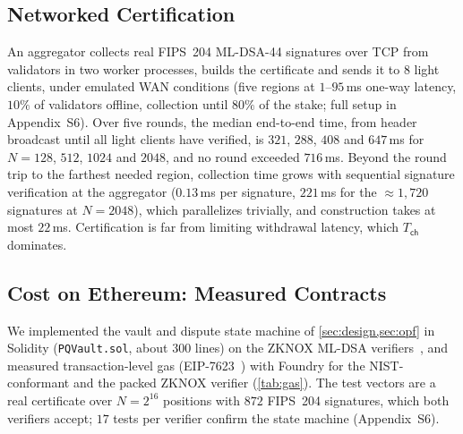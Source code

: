 \documentclass[10pt,journal,compsoc]{IEEEtran}
\theoremstyle{tplain}
\theoremstyle{tdef}
\theoremstyle{remark}
\newcommand{\supp}[1]{Appendix~#1}
\begin{document}
\subsection{Networked Certification}
An aggregator collects real FIPS~204 ML-DSA-44 signatures over TCP from validators in two worker processes, builds the certificate and sends it to $8$ light clients, under emulated WAN conditions (five regions at $1$--$95$\,ms one-way latency, $10\%$ of validators offline, collection until $80\%$ of the stake; full setup in \supp{S6}). Over five rounds, the median end-to-end time, from header broadcast until all light clients have verified, is $321$, $288$, $408$ and $647$\,ms for $N=128$, $512$, $1024$ and $2048$, and no round exceeded $716$\,ms. Beyond the round trip to the farthest needed region, collection time grows with sequential signature verification at the aggregator ($0.13$\,ms per signature, $221$\,ms for the ${\approx}1{,}720$ signatures at $N=2048$), which parallelizes trivially, and construction takes at most $22$\,ms. Certification is far from limiting withdrawal latency, which $T_{\mathsf{ch}}$ dominates.

\subsection{Cost on Ethereum: Measured Contracts}\label{sec:gas}
We implemented the vault and dispute state machine of \cref{sec:design,sec:opf} in Solidity (\texttt{PQVault.sol}, about $300$ lines) on the ZKNOX ML-DSA verifiers~\cite{zknox_dilithium}, and measured transaction-level gas (EIP-7623~\cite{eip7623}) with Foundry for the NIST-conformant and the packed ZKNOX verifier (\cref{tab:gas}). The test vectors are a real certificate over $N=2^{16}$ positions with $872$ FIPS~204 signatures, which both verifiers accept; $17$ tests per verifier confirm the state machine (\supp{S6}).
\end{document}
